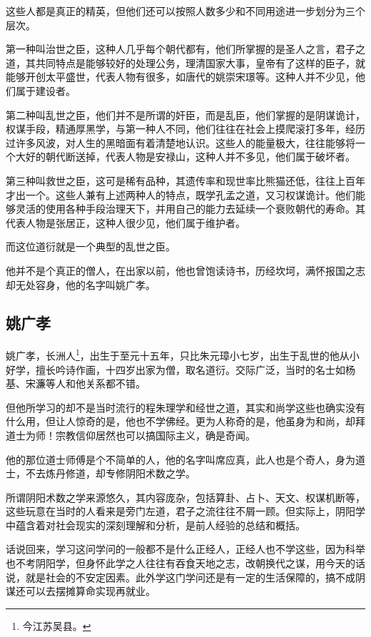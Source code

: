 \begin{multicols}{\theparacolNo}
		这些人都是真正的精英，但他们还可以按照人数多少和不同用途进一步划分为三个层次。

		第一种叫治世之臣，这种人几乎每个朝代都有，他们所掌握的是圣人之言，君子之道，其共同特点是能够较好的处理公务，理清国家大事，皇帝有了这样的臣子，就能够开创太平盛世，代表人物有很多，如唐代的姚崇宋璟等。这种人并不少见，他们属于建设者。

		第二种叫乱世之臣，他们并不是所谓的奸臣，而是乱臣，他们掌握的是阴谋诡计，权谋手段，精通厚黑学，与第一种人不同，他们往往在社会上摸爬滚打多年，经历过许多风波，对人生的黑暗面有着清楚地认识。这些人的能量极大，往往能够将一个大好的朝代断送掉，代表人物是安禄山，这种人并不多见，他们属于破坏者。

		第三种叫救世之臣，这可是稀有品种，其遗传率和现世率比熊猫还低，往往上百年才出一个。这些人兼有上述两种人的特点，既学孔孟之道，又习权谋诡计。他们能够灵活的使用各种手段治理天下，并用自己的能力去延续一个衰败朝代的寿命。其代表人物是张居正，这种人很少见，他们属于维护者。

		而这位道衍就是一个典型的乱世之臣。

		他并不是个真正的僧人，在出家以前，他也曾饱读诗书，历经坎坷，满怀报国之志却无处容身，他的名字叫姚广孝。

		\subsection{姚广孝}
		姚广孝，长洲人\footnote{今江苏吴县。}，出生于至元十五年，只比朱元璋小七岁，出生于乱世的他从小好学，擅长吟诗作画，十四岁出家为僧，取名道衍。交际广泛，当时的名士如杨基、宋濂等人和他关系都不错。

		但他所学习的却不是当时流行的程朱理学和经世之道，其实和尚学这些也确实没有什么用，但让人惊奇的是，他也不学佛经。更为人称奇的是，他虽身为和尚，却拜道士为师！宗教信仰居然也可以搞国际主义，确是奇闻。

		他的那位道士师傅是个不简单的人，他的名字叫席应真，此人也是个奇人，身为道士，不去炼丹修道，却专修阴阳术数之学。

		所谓阴阳术数之学来源悠久，其内容庞杂，包括算卦、占卜、天文、权谋机断等，这些玩意在当时的人看来是旁门左道，君子之流往往不屑一顾。但实际上，阴阳学中蕴含着对社会现实的深刻理解和分析，是前人经验的总结和概括。

		话说回来，学习这问学问的一般都不是什么正经人，正经人也不学这些，因为科举也不考阴阳学，但身怀此学之人往往有吞食天地之志，改朝换代之谋，用今天的话说，就是社会的不安定因素。此外学这门学问还是有一定的生活保障的，搞不成阴谋还可以去摆摊算命实现再就业。


\end{multicols}
